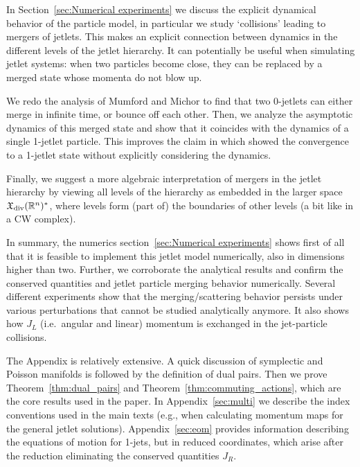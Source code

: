 \documentclass[12pt]{amsart}
\begin{document}
In Section~\ref{sec:Numerical experiments} we discuss the explicit dynamical behavior of the
particle model, in particular we study `collisions' leading to mergers of jetlets.
This makes an explicit connection between dynamics in the different
levels of the jetlet hierarchy. It can potentially be useful when
simulating jetlet systems: when two particles become close, they
can be replaced by a merged state whose momenta do not blow up.

We redo the analysis of Mumford and Michor to find that two 0-jetlets
can either merge in infinite time, or bounce off each other.
Then, we analyze the asymptotic dynamics of this merged state and show
that it coincides with the dynamics of a single 1-jetlet particle. This
improves the claim in \cite{CotterHolmJacobsMeier2014} which showed the
convergence to a 1-jetlet state without explicitly considering the dynamics.

Finally, we suggest a more algebraic interpretation of mergers in
the jetlet hierarchy by viewing all levels of the hierarchy as embedded
in the larger space $\mathfrak{X}_{\rm div}(\mathbb{R}^n)^*$, where levels form (part of) the
boundaries of other levels (a bit like in a CW complex).

In summary, the numerics section~\ref{sec:Numerical experiments} shows first of all that it is feasible to implement this jetlet model numerically, also in dimensions higher than
two. Further, we corroborate the analytical results and confirm the
conserved quantities and jetlet particle merging behavior numerically.
Several different experiments show that the merging/scattering behavior persists
under various perturbations that cannot be studied analytically anymore.
It also shows how $J_L$ (i.e.\ angular and linear) momentum is exchanged
in the jet-particle collisions.



The Appendix is relatively extensive. A quick discussion of symplectic and Poisson manifolds is followed by the definition of dual pairs. Then we prove Theorem~\ref{thm:dual_pairs} and Theorem~\ref{thm:commuting_actions}, which are the core results used in the paper. In Appendix~\ref{sec:multi} we describe the index conventions used in the main texts (e.g., when calculating momentum maps for the general jetlet solutions). Appendix~\ref{sec:eom} provides information describing the equations of motion for 1-jets, but in reduced coordinates, which arise after the reduction eliminating the conserved quantities $J_R$.
\end{document}
